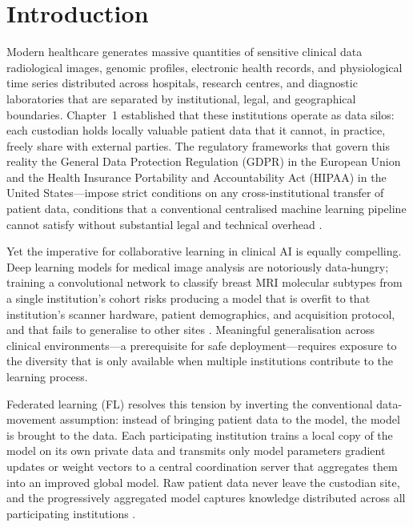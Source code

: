 \section{Introduction}
\label{sec:ch2-intro}

Modern healthcare generates massive quantities of sensitive clinical
data radiological images, genomic profiles, electronic health records,
and physiological time series distributed across hospitals, research
centres, and diagnostic laboratories that are separated by
institutional, legal, and geographical boundaries.
Chapter~1 established that these institutions operate as data silos:
each custodian holds locally valuable patient data that it cannot, in
practice, freely share with external parties.
The regulatory frameworks that govern this reality the General Data
Protection Regulation (GDPR) in the European Union and the Health
Insurance Portability and Accountability Act (HIPAA) in the United
States—impose strict conditions on any cross-institutional transfer of
patient data, conditions that a conventional centralised machine
learning pipeline cannot satisfy without substantial legal and
technical overhead \cite{gdpr2016regulation,hipaa1996health}.

Yet the imperative for collaborative learning in clinical AI is equally
compelling.
Deep learning models for medical image analysis are notoriously
data-hungry; training a convolutional network to classify breast MRI
molecular subtypes from a single institution's cohort risks producing a
model that is overfit to that institution's scanner hardware, patient
demographics, and acquisition protocol, and that fails to generalise to
other sites \cite{rieke2020future}.
Meaningful generalisation across clinical environments—a prerequisite
for safe deployment—requires exposure to the diversity that is only
available when multiple institutions contribute to the learning process.

Federated learning (FL) resolves this tension by inverting the
conventional data-movement assumption: instead of bringing patient data
to the model, the model is brought to the data.
Each participating institution trains a local copy of the model on its
own private data and transmits only model parameters gradient updates
or weight vectors to a central coordination server that aggregates them
into an improved global model.
Raw patient data never leave the custodian site, and the progressively
aggregated model captures knowledge distributed across all participating
institutions \cite{mcmahan2017communication,kairouz2021advances}.

